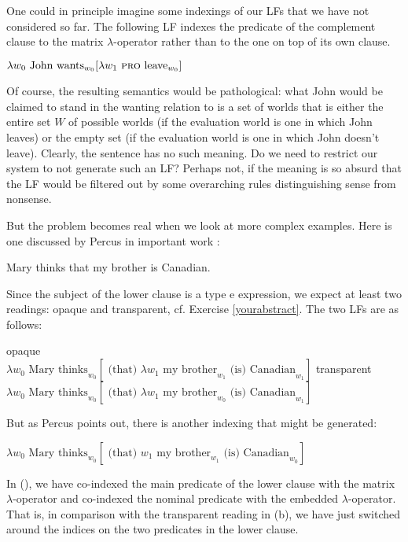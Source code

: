 One could in principle imagine some indexings of our LFs that we have not considered so far. The following LF indexes the predicate of the complement clause to the matrix $\lambda$-operator rather than to the one on top of its own clause.

\ex $\lambda w_{0} \mbox{ John wants}_{w_{0}} [ \lambda w_{1} \mbox{ \textsc{pro} } \mbox{leave}_{w_{0}} ]$ \xe

Of course, the resulting semantics would be pathological: what John would be claimed to stand in the wanting relation to is a set of worlds that is either the entire set $W$ of possible worlds (if the evaluation world is one in which John leaves) or the empty set (if the evaluation world is one in which John doesn't leave). Clearly, the sentence has no such meaning. Do we need to restrict our system to not generate such an LF? Perhaps not, if the meaning is so absurd that the LF would be filtered out by some overarching rules distinguishing sense from nonsense.

But the problem becomes real when we look at more complex examples. Here is one discussed by Percus in important work \citep{percus:other00}:

\ex Mary thinks that my brother is Canadian. \xe

Since the subject of the lower clause is a type e expression, we expect at least two readings: opaque and transparent, cf. Exercise \ref{yourabstract}. The two LFs are as follows:

\pex
\a opaque\\
$\lambda w_{0} \mbox{ Mary thinks}_{w_{0}} [ \mbox{ (that) } \lambda w_{1} \mbox{ my brother}_{w_{1}} \mbox{ (is) Canadian}_{w_{1}} ]$
\a transparent\\
$\lambda w_{0} \mbox{ Mary thinks}_{w_{0}} [ \mbox{ (that) } \lambda w_{1} \mbox{ my brother}_{w_{0}} \mbox{ (is) Canadian}_{w_{1}} ]$
\xe

But as Percus points out, there is another indexing that might be generated:

\ex $\lambda w_{0} \mbox{ Mary thinks}_{w_{0}} [ \mbox{ (that) } w_{1} \mbox{ my brother}_{w_{1}} \mbox{ (is) Canadian}_{w_{0}} ]$ \xe

In (\lastx), we have co-indexed the main predicate of the lower clause with the matrix $\lambda$-operator and co-indexed the nominal predicate  with the embedded $\lambda$-operator. That is, in comparison with the transparent reading in (\blastx b), we have just switched around the indices on the two predicates in the lower clause.

